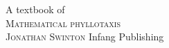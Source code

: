 

\thispagestyle{titlingpage}
{
{}	
	\centering
	{\Huge A textbook of }
	\\[3ex]
	{\HUGE\jEmphasisColour	\textsc{Mathematical phyllotaxis}}\\
	\vfill
	{\Huge	\scshape Jonathan Swinton}
	\vfill
	{\Large	Infang Publishing}
	\\[3ex]
	{\Large \textsc{\jPublicationYear}
		\\}
}
\newpage

